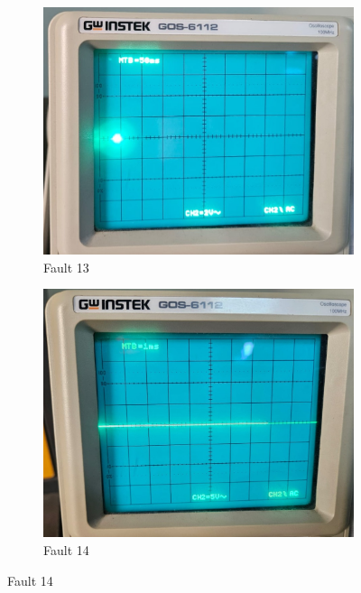 \documentclass[a4paper,12pt]{article}
\begin{document}
\begin{figure}[H]
	\begin{subfigure}[t]{0.44\textwidth}
		\centering
		\includegraphics[width=1\linewidth]{Images/1.13}
		\caption{Fault 13}
		\vspace{0.1cm}
	\end{subfigure}
	\hfil
	\begin{subfigure}[t]{0.44\textwidth}
		\centering
		\includegraphics[width=1\linewidth]{Images/1.14}
		\caption{Fault 14}
		\vspace{0.1cm}
	\end{subfigure}
	

\end{figure}
\end{document}
